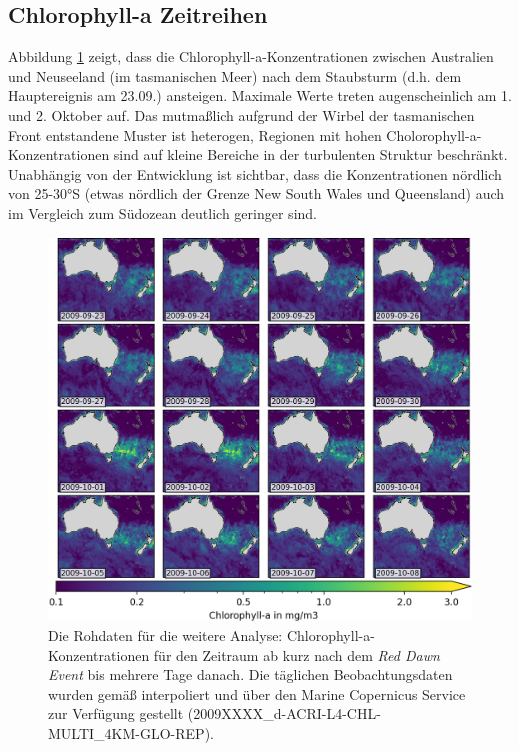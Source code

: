\documentclass[12pt,a4paper,onecolumn,draft]{scrartcl}
\begin{document}
\subsection{Chlorophyll-a Zeitreihen} \label{sec:chla_zeitreihen}
Abbildung \ref{fig:chla_collage} zeigt, dass die Chlorophyll-a-Konzentrationen zwischen Australien und Neuseeland (im tasmanischen Meer) nach dem Staubsturm (d.h. dem Hauptereignis am 23.09.) ansteigen. Maximale Werte treten augenscheinlich am 1. und 2. Oktober auf. Das mutmaßlich aufgrund der Wirbel der tasmanischen Front \citep{Gabric.2016} entstandene Muster ist heterogen, Regionen mit hohen Cholorophyll-a-Konzentrationen sind auf kleine Bereiche in der turbulenten Struktur beschränkt. Unabhängig von der Entwicklung ist sichtbar, dass die Konzentrationen nördlich von 25-30°S (etwas nördlich der Grenze New South Wales und Queensland) auch im Vergleich zum Südozean deutlich geringer sind.
\begin{figure}
\includegraphics[width=\textwidth]{bilder/chl_collage.png}
\caption{Die Rohdaten für die weitere Analyse: Chlorophyll-a-Konzentrationen für den Zeitraum ab kurz nach dem \textit{Red Dawn Event} bis mehrere Tage danach. Die täglichen Beobachtungsdaten wurden gemäß \cite{Saulquin.2019} interpoliert und über den Marine Copernicus Service zur Verfügung gestellt (2009XXXX_d-ACRI-L4-CHL-MULTI_4KM-GLO-REP).} \label{fig:chla_collage}
\end{figure}
\end{document}
